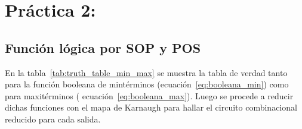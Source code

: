 \section{Práctica 2:}

\subsection{Función lógica por SOP y POS}

En la tabla~\ref{tab:truth_table_min_max} se muestra la tabla de verdad tanto para la función booleana de mintérminos (ecuación~\ref{eq:booleana_min}) como para maxitérminos ( ecuación~\ref{eq:booleana_max}). Luego se procede a reducir dichas funciones con el mapa de Karnaugh para hallar el circuito combinacional reducido para cada salida.

